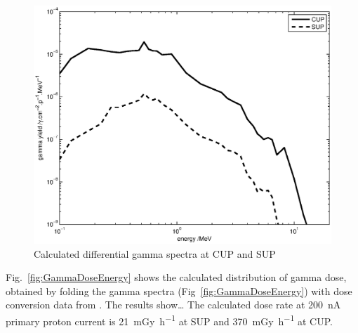 \documentclass[11pt,a4paper]{IEEEtran}
\let\MYoriglatexcaption\caption
\renewcommand{\caption}[2][\relax]{\MYoriglatexcaption[#2]{#2}}
\begin{document}
\begin{figure}[t]
    \centering
    \includegraphics[width=\columnwidth]{gDYieldcomparedRADECS.eps}
    \caption{Calculated differential gamma spectra at CUP and SUP}
    \label{fig:DifferentialGammaSpectra}
\end{figure}

Fig.~\ref{fig:GammaDoseEnergy} shows the calculated distribution of gamma dose, obtained by folding the gamma spectra (Fig~\ref{fig:GammaDoseEnergy}) with dose conversion data from \cite{tbd}.
The results show\ldots
{}
The calculated dose rate at \SI{200}{\nA} primary proton current is \SI{21}{\milli\gray\per\hour} at SUP and \SI{370}{\milli\gray\per\hour} at CUP.
\end{document}
